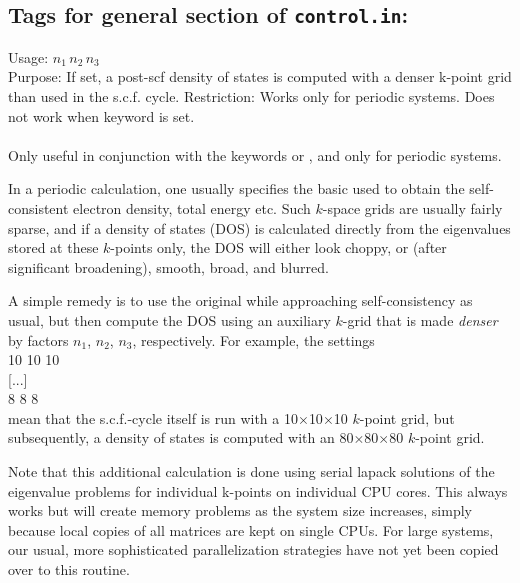 \subsection*{Tags for general section of \texttt{control.in}:}


{
  \noindent
  Usage:  $n_1 \, n_2 \, n_3$ \\[1.0ex]
  Purpose: If set, a post-scf density of states is computed with a
    denser k-point grid than used in the s.c.f. cycle.
  Restriction: Works only for periodic systems. Does not work when keyword
     is set. \\[1.0ex]
 \\[1.0ex]
}
%
Only useful in conjunction with the keywords 
 or 
, and only for periodic systems.

In a periodic calculation, one usually specifies the basic
 used to obtain the self-consistent electron density,
total energy etc. Such $k$-space grids are usually fairly sparse, and
if a density of states (DOS) is calculated directly from the eigenvalues
stored at these $k$-points only, the DOS will either look choppy, or
(after significant broadening), smooth, broad, and blurred.

A simple remedy is to use the original  while
approaching self-consistency as usual, but then compute the DOS using
an auxiliary $k$-grid that is made \emph{denser} by factors $n_1$,
$n_2$, $n_3$, respectively. For example, the settings \\
   10 10 10 \\
    [...] \\
   8 8 8 \\
mean that the s.c.f.-cycle itself is run with a 10$\times$10$\times$10
$k$-point grid, but subsequently, a density of states is computed with
an 80$\times$80$\times$80 $k$-point grid.

Note that this additional calculation is done using serial lapack solutions
of the eigenvalue problems for individual k-points on individual CPU cores.
This always works but will create memory problems as the system size increases,
simply because local copies of all matrices are kept on single CPUs. For large
systems, our usual, more sophisticated parallelization strategies have not yet
been copied over to this routine.

